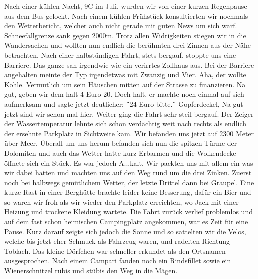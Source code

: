 Nach einer kühlen Nacht, 9\textdegree C im Juli, wurden wir von einer kurzen Regenpause aus dem Bus gelockt.
Nach einem kühlen Frühstück konsultierten wir nochmals den Wetterbericht, welcher auch nicht gerade mit guten News um sich warf.
Schneefallgrenze sank gegen 2000m.
Trotz allen Widrigkeiten stiegen wir in die Wandersachen und wollten nun endlich die berühmten drei Zinnen aus der Nähe betrachten.
Nach einer halbstündigen Fahrt, stets bergauf, stoppte uns eine Barriere.
Das ganze sah irgendwie wie ein verirrtes Zollhaus aus.
Bei der Barriere angehalten meinte der Typ irgendetwas mit Zwanzig und Vier.
Aha, der wollte Kohle.
Vermutlich um sein Häuschen mitten auf der Strasse zu finanzieren.
Na gut, geben wir dem halt 4 Euro 20.
Doch halt, er machte noch einmal auf sich aufmerksam und sagte jetzt deutlicher: ¨24 Euro bitte.¨
Gopferdeckel, Na gut jetzt sind wir schon mal hier.
Weiter ging die Fahrt sehr steil bergauf.
Der Zeiger der Wassertemperatur lehnte sich schon verdächtig weit nach rechts als endlich der ersehnte Parkplatz in Sichtweite kam.
Wir befanden uns jetzt auf 2300 Meter über Meer.
Überall um uns herum befanden sich nun die spitzen Türme der Dolomiten und auch das Wetter hatte kurz Erbarmen und die Wolkendecke öffnete sich ein Stück.
Es war jedoch A...kalt.
Wir packten uns mit allem ein was wir dabei hatten und machten uns auf den Weg rund um die drei Zinken.
Zuerst noch bei halbwegs gemütlichem Wetter, der letzte Drittel dann bei Graupel.
Eine kurze Rast in einer Berghütte brachte leider keine Besserung, dafür ein Bier und so waren wir froh als wir wieder den Parkplatz erreichten, wo Jack mit einer Heizung und trockene Kleidung wartete.
Die Fahrt zurück verlief problemlos und auf dem fast schon heimischen Campingplatz angekommen, war es Zeit für eine Pause.
Kurz darauf zeigte sich jedoch die Sonne und so sattelten wir die Velos, welche bis jetzt eher Schmuck als Fahrzeug waren, und radelten Richtung Toblach.
Das kleine Dörfchen war schneller erkundet als den Ortsnamen ausgesprochen.
Nach einem Campari fanden noch ein Rindsfillet sowie ein Wienerschnitzel rübis und stübis den Weg in die Mägen. 

